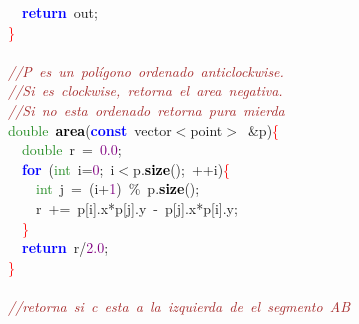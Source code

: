 \mbox{}\ \ \textbf{\textcolor{Blue}{return}}\ out\textcolor{BrickRed}{;} \\
\mbox{}\textcolor{Red}{\}} \\
\mbox{} \\
\mbox{}\textit{\textcolor{Brown}{//P\ es\ un\ polígono\ ordenado\ anticlockwise.}} \\
\mbox{}\textit{\textcolor{Brown}{//Si\ es\ clockwise,\ retorna\ el\ area\ negativa.}} \\
\mbox{}\textit{\textcolor{Brown}{//Si\ no\ esta\ ordenado\ retorna\ pura\ mierda}} \\
\mbox{}\textcolor{ForestGreen}{double}\ \textbf{\textcolor{Black}{area}}\textcolor{BrickRed}{(}\textbf{\textcolor{Blue}{const}}\ vector\textcolor{BrickRed}{$<$}point\textcolor{BrickRed}{$>$}\ \textcolor{BrickRed}{\&}p\textcolor{BrickRed}{)}\textcolor{Red}{\{} \\
\mbox{}\ \ \textcolor{ForestGreen}{double}\ r\ \textcolor{BrickRed}{=}\ \textcolor{Purple}{0.0}\textcolor{BrickRed}{;} \\
\mbox{}\ \ \textbf{\textcolor{Blue}{for}}\ \textcolor{BrickRed}{(}\textcolor{ForestGreen}{int}\ i\textcolor{BrickRed}{=}\textcolor{Purple}{0}\textcolor{BrickRed}{;}\ i\textcolor{BrickRed}{$<$}p\textcolor{BrickRed}{.}\textbf{\textcolor{Black}{size}}\textcolor{BrickRed}{();}\ \textcolor{BrickRed}{++}i\textcolor{BrickRed}{)}\textcolor{Red}{\{} \\
\mbox{}\ \ \ \ \textcolor{ForestGreen}{int}\ j\ \textcolor{BrickRed}{=}\ \textcolor{BrickRed}{(}i\textcolor{BrickRed}{+}\textcolor{Purple}{1}\textcolor{BrickRed}{)}\ \textcolor{BrickRed}{\%}\ p\textcolor{BrickRed}{.}\textbf{\textcolor{Black}{size}}\textcolor{BrickRed}{();} \\
\mbox{}\ \ \ \ r\ \textcolor{BrickRed}{+=}\ p\textcolor{BrickRed}{[}i\textcolor{BrickRed}{].}x\textcolor{BrickRed}{*}p\textcolor{BrickRed}{[}j\textcolor{BrickRed}{].}y\ \textcolor{BrickRed}{-}\ p\textcolor{BrickRed}{[}j\textcolor{BrickRed}{].}x\textcolor{BrickRed}{*}p\textcolor{BrickRed}{[}i\textcolor{BrickRed}{].}y\textcolor{BrickRed}{;} \\
\mbox{}\ \ \textcolor{Red}{\}} \\
\mbox{}\ \ \textbf{\textcolor{Blue}{return}}\ r\textcolor{BrickRed}{/}\textcolor{Purple}{2.0}\textcolor{BrickRed}{;} \\
\mbox{}\textcolor{Red}{\}} \\
\mbox{} \\
\mbox{}\textit{\textcolor{Brown}{//retorna\ si\ c\ esta\ a\ la\ izquierda\ de\ el\ segmento\ AB}} \\

